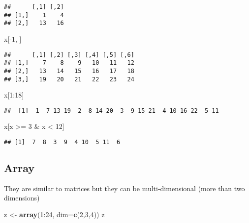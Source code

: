 \documentclass[]{book}
\newenvironment{Shaded}{\begin{snugshade}}{\end{snugshade}}
\newcommand{\KeywordTok}[1]{\textcolor[rgb]{0.13,0.29,0.53}{\textbf{{#1}}}}
\newcommand{\DataTypeTok}[1]{\textcolor[rgb]{0.13,0.29,0.53}{{#1}}}
\newcommand{\DecValTok}[1]{\textcolor[rgb]{0.00,0.00,0.81}{{#1}}}
\newcommand{\StringTok}[1]{\textcolor[rgb]{0.31,0.60,0.02}{{#1}}}
\newcommand{\NormalTok}[1]{{#1}}
\begin{document}
\begin{verbatim}
##      [,1] [,2]
## [1,]    1    4
## [2,]   13   16
\end{verbatim}

\begin{Shaded}
\begin{Highlighting}[]
\NormalTok{x[-}\DecValTok{1}\NormalTok{, ]}
\end{Highlighting}
\end{Shaded}

\begin{verbatim}
##      [,1] [,2] [,3] [,4] [,5] [,6]
## [1,]    7    8    9   10   11   12
## [2,]   13   14   15   16   17   18
## [3,]   19   20   21   22   23   24
\end{verbatim}

\begin{Shaded}
\begin{Highlighting}[]
\NormalTok{x[}\DecValTok{1}\NormalTok{:}\DecValTok{18}\NormalTok{]}
\end{Highlighting}
\end{Shaded}

\begin{verbatim}
##  [1]  1  7 13 19  2  8 14 20  3  9 15 21  4 10 16 22  5 11
\end{verbatim}

\begin{Shaded}
\begin{Highlighting}[]
\NormalTok{x[x >=}\StringTok{ }\DecValTok{3} \NormalTok{&}\StringTok{ }\NormalTok{x <}\StringTok{ }\DecValTok{12}\NormalTok{]}
\end{Highlighting}
\end{Shaded}

\begin{verbatim}
## [1]  7  8  3  9  4 10  5 11  6
\end{verbatim}

\subsection{Array}\label{array}

They are similar to matrices but they can be multi-dimensional (more
than two dimensions)

\begin{Shaded}
\begin{Highlighting}[]
\NormalTok{z <-}\StringTok{ }\KeywordTok{array}\NormalTok{(}\DecValTok{1}\NormalTok{:}\DecValTok{24}\NormalTok{, }\DataTypeTok{dim=}\KeywordTok{c}\NormalTok{(}\DecValTok{2}\NormalTok{,}\DecValTok{3}\NormalTok{,}\DecValTok{4}\NormalTok{))}
\NormalTok{z}
\end{Highlighting}
\end{Shaded}
\end{document}

